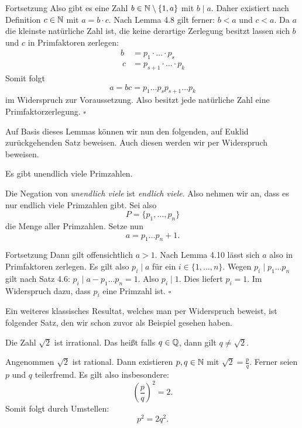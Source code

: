\begin{frame}
\begin{block}{Fortsetzung}
Also gibt es eine Zahl $b \in \mathbb{N} \setminus \{1,a\}$ mit $b \mid a$.
Daher existiert nach Definition $c \in \mathbb{N}$ mit $a = b \cdot c$.
Nach Lemma 4.8 gilt ferner:
$b < a$ und $c < a$. Da $a$ die kleinste natürliche Zahl ist, die keine
derartige Zerlegung besitzt lassen sich $b$ und $c$ in Primfaktoren zerlegen:
\begin{align*}
    b &= p_1 \cdot \ldots \cdot p_s \\\
    c &= p_{s+1} \cdot \ldots \cdot p_k
\end{align*}
Somit folgt
\[
    a = b c = p_1 \ldots p_s p_{s+1} \ldots p_k
\]
im Widerspruch zur Voraussetzung.
Also besitzt jede natürliche Zahl eine Primfaktorzerlegung.
\hfill $\square$
\end{block}
\end{frame}


\begin{frame}
Auf Basis dieses Lemmas können wir nun den folgenden, auf Euklid
zurückgehenden Satz beweisen.
Auch diesen werden wir per Widerspruch beweisen.

\begin{theorem}
Es gibt unendlich viele Primzahlen.
\end{theorem}

\begin{proof*}
Die Negation von \textit{unendlich viele} ist \textit{endlich viele}.
Also nehmen wir an, dass es nur endlich viele Primzahlen gibt.
Sei also
\[
  P = \{p_1,\ldots,p_n\}
\]
die Menge aller Primzahlen.
Setze nun
\[
  a = p_1 \ldots p_n + 1.
\]
\end{proof*}
\end{frame}


\begin{frame}
\begin{block}{Fortsetzung}
Dann gilt offensichtlich $a>1$.
Nach Lemma 4.10 lässt sich $a$ also in Primfaktoren zerlegen.
Es gilt also $p_i \mid a$ für ein $i \in \{1,\ldots,n\}$.
Wegen $p_i \mid p_1 ... p_n$ gilt nach Satz 4.6:
$p_i \mid a - p_1 ... p_n = 1$.
Also $p_i \mid 1$.
Dies liefert $p_i = 1$.
Im Widerspruch dazu, dass $p_i$ eine Primzahl ist.
\hfill $\square$
\end{block}
\end{frame}


\begin{frame}
Ein weiteres klassisches Resultat, welches man per Widerspruch beweist, ist
folgender Satz, den wir schon zuvor als Beispiel gesehen haben.

\begin{theorem}
Die Zahl $\sqrt{2}$ ist irrational.
Das heißt falls $q \in \mathbb{Q}$, dann gilt $q \neq \sqrt{2}$.
\end{theorem}

\begin{proof*}
Angenommen $\sqrt{2}$ ist rational.
Dann existieren $p,q \in \mathbb{N}$ mit $\sqrt{2} = \frac{p}{q}$.
Ferner seien $p$ und $q$ teilerfremd.
Es gilt also insbesondere:
\[
  \left(\frac{p}{q}\right)^2 = 2 .
\]
Somit folgt durch Umstellen:
\[
  p^2 = 2q^2.
\]
\end{proof*}
\end{frame}


